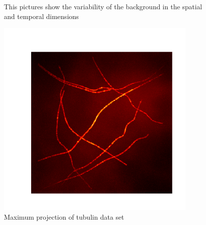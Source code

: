 \begin{figure}
\hfill
{}
	\caption{This pictures show the variability of the background in the spatial and temporal dimensions}
	\label{tubulinVariableBg}	
\end{figure}

\begin{figure}
\centering
\includegraphics[width = 0.88\textwidth]{pictures/maximumProjectionTubulinFarbig.png}
	\caption{Maximum projection of tubulin data set}
	\label{pctMaximumProjTubulin}


\end{figure}

